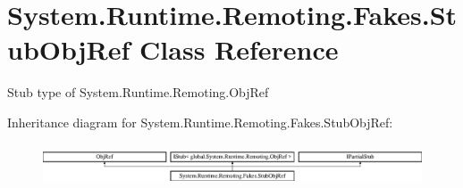\hypertarget{class_system_1_1_runtime_1_1_remoting_1_1_fakes_1_1_stub_obj_ref}{\section{System.\-Runtime.\-Remoting.\-Fakes.\-Stub\-Obj\-Ref Class Reference}
\label{class_system_1_1_runtime_1_1_remoting_1_1_fakes_1_1_stub_obj_ref}
}


Stub type of System.\-Runtime.\-Remoting.\-Obj\-Ref 


Inheritance diagram for System.\-Runtime.\-Remoting.\-Fakes.\-Stub\-Obj\-Ref\-:\begin{figure}[H]
\begin{center}
\leavevmode
\includegraphics[height=1.261261cm]{class_system_1_1_runtime_1_1_remoting_1_1_fakes_1_1_stub_obj_ref}
\end{center}
\end{figure}
